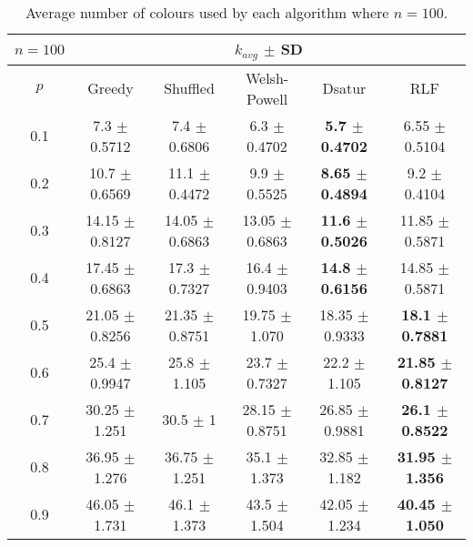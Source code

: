 \begin{table}[H]
    \centering
    \begin{tabular}{cccccc}
        
        $n = 100$& \multicolumn{5}{c}{$k_{avg}$ $\pm$ SD} \\
        \hline
        $p$ & Greedy & Shuffled & Welsh-Powell & Dsatur & RLF \\
        \hline
         0.1 & 7.3 $\pm$ 0.5712 & 7.4 $\pm$ 0.6806  & 6.3 $\pm$ 0.4702 & \textbf{5.7 $\pm$ 0.4702} & 6.55 $\pm$ 0.5104 \\
        0.2 & 10.7 $\pm$ 0.6569 & 11.1 $\pm$ 0.4472 & 9.9 $\pm$ 0.5525 & \textbf{8.65 $\pm$ 0.4894} & 9.2 $\pm$ 0.4104 \\
        0.3 & 14.15 $\pm$ 0.8127 & 14.05 $\pm$ 0.6863 & 13.05 $\pm$ 0.6863 & \textbf{11.6 $\pm$ 0.5026} & 11.85 $\pm$ 0.5871 \\
        0.4 & 17.45 $\pm$ 0.6863 & 17.3 $\pm$ 0.7327 & 16.4 $\pm$ 0.9403 & \textbf{14.8 $\pm$ 0.6156} & 14.85 $\pm$ 0.5871 \\
        0.5 & 21.05 $\pm$ 0.8256 & 21.35 $\pm$ 0.8751 & 19.75 $\pm$ 1.070 & 18.35 $\pm$ 0.9333 & \textbf{18.1 $\pm$ 0.7881} \\
        0.6 & 25.4 $\pm$ 0.9947 & 25.8 $\pm$ 1.105 & 23.7 $\pm$ 0.7327 & 22.2 $\pm$ 1.105 & \textbf{21.85 $\pm$ 0.8127} \\
        0.7 & 30.25 $\pm$ 1.251 & 30.5 $\pm$ 1 & 28.15 $\pm$ 0.8751 & 26.85 $\pm$ 0.9881 & \textbf{26.1 $\pm$ 0.8522} \\
        0.8 & 36.95 $\pm$ 1.276 & 36.75 $\pm$ 1.251 & 35.1 $\pm$ 1.373 & 32.85 $\pm$ 1.182 & \textbf{31.95 $\pm$ 1.356} \\
        0.9 & 46.05 $\pm$ 1.731 & 46.1 $\pm$ 1.373 & 43.5 $\pm$ 1.504 & 42.05 $\pm$ 1.234 & \textbf{40.45 $\pm$ 1.050} \\
        \hline
    \end{tabular}
    \caption{Average number of colours used by each algorithm where $n = 100$.}
    \label{tab:avgKforV100}
\end{table}

